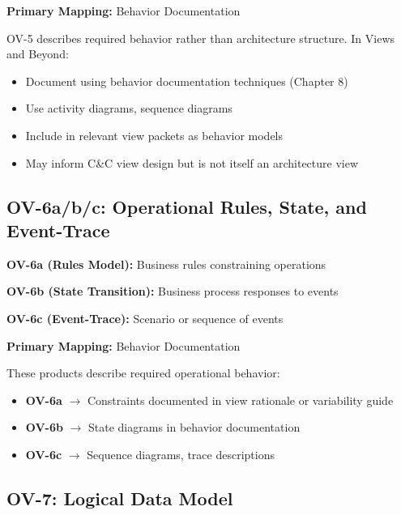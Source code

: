 \documentclass[11pt]{article}
\begin{document}
\begin{vbbox}
\textbf{Primary Mapping:} Behavior Documentation

OV-5 describes required behavior rather than architecture structure. In Views and Beyond:
\begin{itemize}
    \item Document using behavior documentation techniques (Chapter 8)
    \item Use activity diagrams, sequence diagrams
    \item Include in relevant view packets as behavior models
    \item May inform C\&C view design but is not itself an architecture view
\end{itemize}
\end{vbbox}

\subsection{OV-6a/b/c: Operational Rules, State, and Event-Trace}

\begin{dodafbox}
\textbf{OV-6a (Rules Model):} Business rules constraining operations

\textbf{OV-6b (State Transition):} Business process responses to events

\textbf{OV-6c (Event-Trace):} Scenario or sequence of events
\end{dodafbox}

\begin{vbbox}
\textbf{Primary Mapping:} Behavior Documentation

These products describe required operational behavior:
\begin{itemize}
    \item \textbf{OV-6a} $\rightarrow$ Constraints documented in view rationale or variability guide
    \item \textbf{OV-6b} $\rightarrow$ State diagrams in behavior documentation
    \item \textbf{OV-6c} $\rightarrow$ Sequence diagrams, trace descriptions
\end{itemize}
\end{vbbox}

\subsection{OV-7: Logical Data Model}
\end{document}
